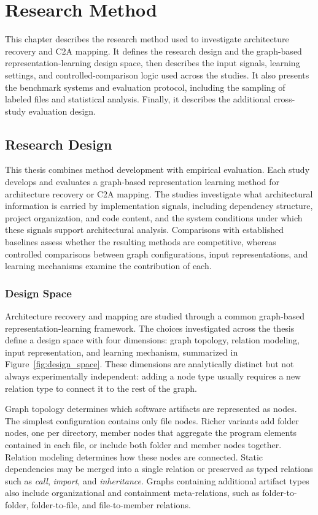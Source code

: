 \chapter{Research Method \label{ch:methodology}}
\chaptertoc

This chapter describes the research method used to investigate architecture recovery and C2A mapping. It defines the research design and the graph-based representation-learning design space, then describes the input signals, learning settings, and controlled-comparison logic used across the studies. It also presents the benchmark systems and evaluation protocol, including the sampling of labeled files and statistical analysis. Finally, it describes the additional cross-study evaluation design.
\section{Research Design \label{sec:research_design}}

This thesis combines method development with empirical evaluation. Each study develops and evaluates a graph-based representation learning method for architecture recovery or C2A mapping. The studies investigate what architectural information is carried by implementation signals, including dependency structure, project organization, and code content, and the system conditions under which these signals support architectural analysis. Comparisons with established baselines assess whether the resulting methods are competitive, whereas controlled comparisons between graph configurations, input representations, and learning mechanisms examine the contribution of each.

\subsection{Design Space\label{sec:design_space}}

Architecture recovery and mapping are studied through a common graph-based representation-learning framework. The choices investigated across the thesis define a design space with four dimensions: graph topology, relation modeling, input representation, and learning mechanism, summarized in Figure~\ref{fig:design_space}. These dimensions are analytically distinct but not always experimentally independent: adding a node type usually requires a new relation type to connect it to the rest of the graph.
 
Graph topology determines which software artifacts are represented as nodes. The simplest configuration contains only file nodes. Richer variants add folder nodes, one per directory, member nodes that aggregate the program elements contained in each file, or include both folder and member nodes together. Relation modeling determines how these nodes are connected. Static dependencies may be merged into a single relation or preserved as typed relations such as \emph{call}, \emph{import}, and \emph{inheritance}. Graphs containing additional artifact types also include organizational and containment meta-relations, such as folder-to-folder, folder-to-file, and file-to-member relations.
 
